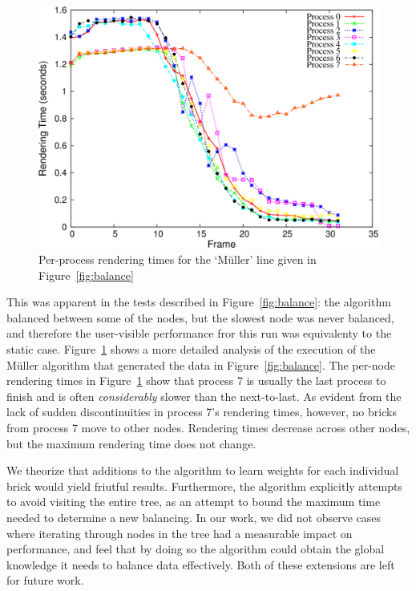 \begin{figure}
  \includegraphics[width=\linewidth]{images/multiscale/mueller}

  \caption{Per-process rendering times for the `M\"uller' line given in
  Figure~\ref{fig:balance}}
  \label{fig:mueller}
\end{figure}

This was apparent in the tests described in Figure~\ref{fig:balance}:
the algorithm balanced between some of the nodes, but the slowest node
was never balanced, and therefore the user-visible performance fror
this run was
equivalenty to the static case.  Figure~\ref{fig:mueller} shows a more
detailed analysis of the execution of the M\"uller algorithm that
generated the data in
Figure~\ref{fig:balance}.  The per-node rendering times in
Figure~\ref{fig:mueller} show that process 7 is usually the last
process to
finish and is often \emph{considerably} slower than the next-to-last.
As evident from the lack of sudden discontinuities in process 7's
rendering times, however, no bricks from process 7 move to other nodes.
Rendering times decrease across other nodes, but the maximum rendering
time does not change.

We theorize that additions to the algorithm to learn weights for each
individual brick would yield friutful results.  Furthermore, the algorithm
explicitly attempts to avoid visiting the entire tree, as an attempt to bound
the maximum time needed to determine a new balancing.  In our work, we did not
observe cases where iterating through nodes in the tree had a measurable
impact on performance, and feel that  by doing so the algorithm could obtain
the global knowledge it needs to balance data effectively.  Both of these
extensions are left for future work.

